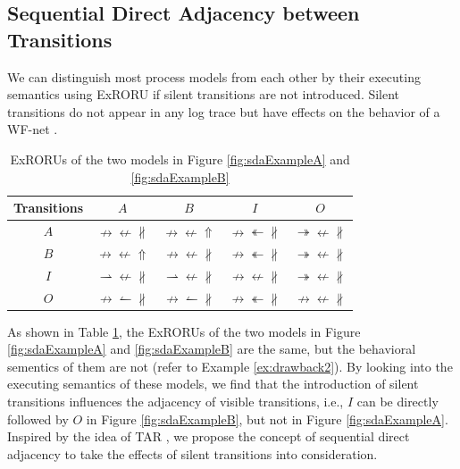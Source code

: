 \documentclass[dvips,...]{llncs}
\makeatletter
\newcommand\tabcaption{\def\@captype{table}\caption}
\makeatother
\begin{document}
\subsection{Sequential Direct Adjacency between Transitions}\label{subsec:sda}
We can distinguish most process models from each other by their executing semantics using ExRORU if silent transitions are not introduced. Silent transitions do not appear in any log trace but have effects on the behavior of a WF-net \cite{de2003workflow}.

\begin{table}[htbp]
\centering
\tabcaption{ExRORUs of the two models in Figure \ref{fig:sdaExampleA} and \ref{fig:sdaExampleB}\label{tab:sdaExample}}
\begin{tabular}{c|c|c|c|c} \hline
	Transitions & $A$ & $B$ & $I$ & $O$\\ \hline
	$A$
		& $\nrightarrow\nleftarrow\nparallel$
		& $\nrightarrow\nleftarrow\Uparrow$
		& $\nrightarrow\twoheadleftarrow\nparallel$
		& $\twoheadrightarrow\nleftarrow\nparallel$
		\\ \hline
	$B$
		& $\nrightarrow\nleftarrow\Uparrow$
		& $\nrightarrow\nleftarrow\nparallel$
		& $\nrightarrow\twoheadleftarrow\nparallel$
		& $\twoheadrightarrow\nleftarrow\nparallel$
		\\ \hline
	$I$
		& $\rightharpoonup\nleftarrow\nparallel$
		& $\rightharpoonup\nleftarrow\nparallel$
		& $\nrightarrow\nleftarrow\nparallel$
		& $\twoheadrightarrow\nleftarrow\nparallel$
		\\ \hline
	$O$
		& $\nrightarrow\leftharpoonup\nparallel$
		& $\nrightarrow\leftharpoonup\nparallel$
		& $\nrightarrow\twoheadleftarrow\nparallel$
		& $\nrightarrow\nleftarrow\nparallel$
		\\ \hline
\end{tabular}
\end{table}

As shown in Table \ref{tab:sdaExample}, the ExRORUs of the two models in Figure \ref{fig:sdaExampleA} and \ref{fig:sdaExampleB} are the same, but the behavioral sementics of them are not (refer to Example \ref{ex:drawback2}). By looking into the executing semantics of these models, we find that the introduction of silent transitions influences the adjacency of visible transitions, i.e., $I$ can be directly followed by $O$ in Figure \ref{fig:sdaExampleB}, but not in Figure \ref{fig:sdaExampleA}. Inspired by the idea of TAR \cite{zha2010workflow}, we propose the concept of sequential direct adjacency to take the effects of silent transitions into consideration.
\end{document}
